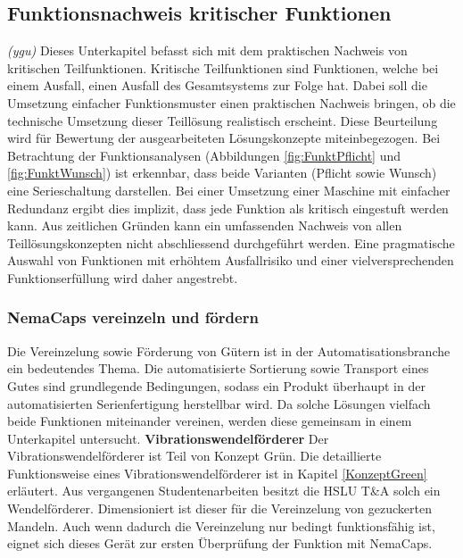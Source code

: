 \subsection{Funktionsnachweis kritischer Funktionen}
\label{funktionsnachweis}
\textit{(ygu)} Dieses Unterkapitel befasst sich mit dem praktischen Nachweis von kritischen Teilfunktionen. Kritische Teilfunktionen sind Funktionen, welche bei einem Ausfall, einen Ausfall des Gesamtsystems zur Folge hat. Dabei soll die Umsetzung einfacher Funktionsmuster einen praktischen Nachweis bringen, ob die technische Umsetzung dieser Teillösung realistisch erscheint. Diese Beurteilung wird für Bewertung der ausgearbeiteten Lösungskonzepte miteinbegezogen.
\newline
Bei Betrachtung der Funktionsanalysen (Abbildungen \ref{fig:FunktPflicht} und \ref{fig:FunktWunsch}) ist erkennbar, dass beide Varianten (Pflicht sowie Wunsch) eine Serieschaltung darstellen. Bei einer Umsetzung einer Maschine mit einfacher Redundanz ergibt dies implizit, dass jede Funktion als kritisch eingestuft werden kann. Aus zeitlichen Gründen kann ein umfassenden Nachweis von allen Teillösungskonzepten nicht abschliessend durchgeführt werden. Eine pragmatische Auswahl von Funktionen mit erhöhtem Ausfallrisiko und einer vielversprechenden Funktionserfüllung wird daher angestrebt.

\subsubsection{NemaCaps vereinzeln und fördern}
Die Vereinzelung sowie Förderung von Gütern ist in der Automatisationsbranche ein bedeutendes Thema. Die automatisierte Sortierung sowie Transport eines Gutes sind grundlegende Bedingungen, sodass ein Produkt überhaupt in der automatisierten Serienfertigung herstellbar wird. Da solche Lösungen vielfach beide Funktionen miteinander vereinen, werden diese gemeinsam in einem Unterkapitel untersucht.
\newline
\newline
\textbf{Vibrationswendelförderer}
\newline
Der Vibrationswendelförderer ist Teil von Konzept Grün. Die detaillierte Funktionsweise eines Vibrationswendelförderer ist in Kapitel \ref{KonzeptGreen} erläutert.
\newline
Aus vergangenen Studentenarbeiten besitzt die HSLU T\&A solch ein Wendelförderer. Dimensioniert ist dieser für die Vereinzelung von gezuckerten Mandeln. Auch wenn dadurch die Vereinzelung nur bedingt funktionsfähig ist, eignet sich dieses Gerät zur ersten Überprüfung der Funktion mit NemaCaps. 

